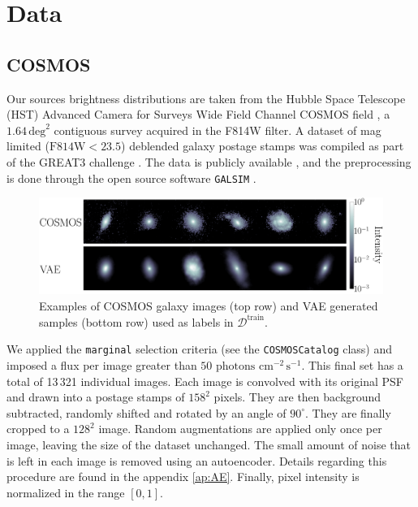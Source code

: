 \documentclass[twocolumn]{aastex631}
\begin{document}


\section{Data}\label{sec:data}



\subsection{COSMOS}\label{sec:source}
Our sources brightness distributions are taken from the Hubble Space Telescope (HST) 
Advanced Camera for Surveys Wide Field Channel COSMOS field \citep{Koekemoer2007,Scoville2007},
a $1.64\,\mathrm{deg}^{2}$ contiguous survey acquired in the F814W filter. 
A dataset of mag limited ($\mathrm{F814W} < 23.5$) deblended galaxy postage stamps \citep{Leauthaud2007} was compiled as 
part of the GREAT3 challenge \citep{Mandelbaum2014}. The data is 
publicly available \citep{Mandelbaum2012}, and the preprocessing is done through the open source software 
\texttt{GALSIM} \citep{Rowe2015}. \par
\begin{figure}
        \centering
        \includegraphics[width=\linewidth]{figures/gal_vae_sample}
        \caption{Examples of COSMOS galaxy images 
                (top row) and VAE generated samples (bottom row) used as labels in $\mathcal{D}^{\mathrm{train}}$.}
        \label{fig:source}
\end{figure}
We applied the 
\texttt{marginal} selection criteria (see the \texttt{COSMOSCatalog} class) and imposed a flux per image
greater than $50\,\,\mathrm{photons}\,\,\mathrm{cm}^{-2}\,\mathrm{s}^{-1}$. 
This final set has a total of 13\,321 individual images.
Each image is convolved with its original PSF and drawn into a postage stamps of $158^2$ pixels. 
They are then 
background subtracted, randomly shifted and rotated by an angle of $90^\circ$. They are finally 
cropped to a $128^2$ image. 
Random augmentations are applied only once per image, leaving the size of the dataset unchanged.
The small amount of noise that is left in each image is removed using an autoencoder. 
Details regarding this 
procedure are found in the appendix \ref{ap:AE}. 
Finally, pixel intensity is 
normalized in the range $[0,1]$.
\end{document}
